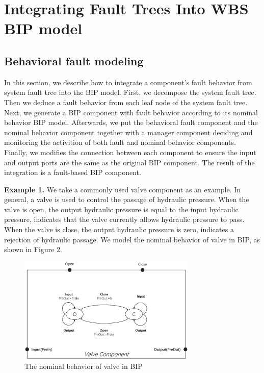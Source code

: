 

\section{Integrating Fault Trees Into WBS BIP model}

\subsection{Behavioral fault modeling}
In this section, we describe how to integrate a component's fault behavior from system fault tree into the BIP model. First, we decompose the system fault tree. Then we deduce a fault behavior from each leaf node of the system fault tree. Next, we generate a BIP component with fault behavior according to its nominal behavior BIP model. Afterwards, we put the behavioral fault component and the nominal behavior component together with a manager component deciding and monitoring the activition of both fault and nominal behavior components. Finally, we modifies the connection between each component to ensure the input and output ports are the same as the original BIP component. The result of the integration is a fault-based BIP component.

\textbf{Example 1.} We take a commonly used valve component as an example. In general, a valve is used to control the passage of hydraulic pressure. When the valve is open, the output hydraulic pressure is equal to the input hydraulic pressure, indicates that the valve currently allows hydraulic pressure to pass. When the valve is close, the output hydraulic pressure is zero, indicates a rejection of hydraulic passage. We model the nominal behavior of valve in BIP, as shown in Figure 2.

\begin{figure}[htbp]
	\centerline{\includegraphics[width=85mm]{figure/example_origin.eps}}
	\caption{The nominal behavior of valve in BIP}
	\label{example_BIP_nominal}
\end{figure}

